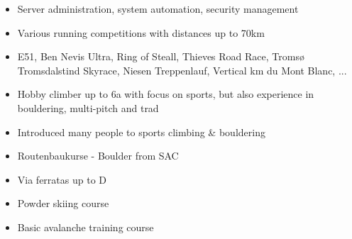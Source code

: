 \documentclass[10pt,a4paper]{altacv}
\begin{document}
    \begin{itemize}
      \item Server administration, system automation, security management
    \end{itemize}
  \divider




\begin{itemize}
  \item{Various running competitions with distances up to 70km}
  \item{E51, Ben Nevis Ultra, Ring of Steall, Thieves Road Race, Tromsø Tromsdalstind Skyrace, Niesen Treppenlauf, Vertical km du Mont Blanc, ...}
\end{itemize}
\divider

\begin{itemize}
  \item{Hobby climber up to 6a with focus on sports, but also experience in bouldering, multi-pitch and trad}
  \item {Introduced many people to sports climbing \& bouldering}
  \item {Routenbaukurse - Boulder from SAC}
  \item{Via ferratas up to D}
\end{itemize}
\divider

\begin{itemize}
  \item{Powder skiing course}
  \item{Basic avalanche training course}

\end{itemize}
\divider
\end{document}
